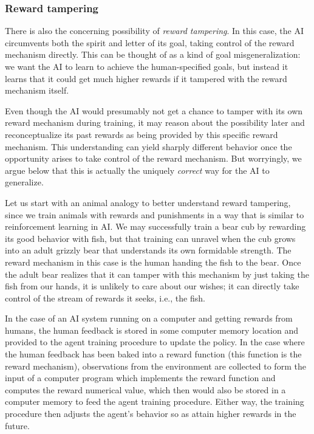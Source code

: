     \subsubsection{Reward tampering}
    \label{sec:existential:misagencyreward:tampering}

There is also the concerning possibility of \textit{reward tampering}. In this case, the AI circumvents both the spirit and letter of its goal, taking control of the reward mechanism directly. This can be thought of as a kind of goal misgeneralization: we want the AI to learn to achieve the human-specified goals, but instead it learns that it could get much higher rewards if it tampered with the reward mechanism itself.

Even though the AI would presumably not get a chance to tamper with its own reward mechanism during training, it may reason about the possibility later and reconceptualize its past rewards as being provided by this specific reward mechanism. 
This understanding can yield sharply different behavior once the opportunity arises to take control of the reward mechanism. But worryingly, we argue below that this is actually the uniquely \emph{correct} way for the AI to generalize.

Let us start with an animal analogy to better understand reward tampering, since we train animals with rewards and punishments in a way that is similar to reinforcement learning in AI. We may successfully train a bear cub by rewarding its good behavior with fish, but that training can unravel when the cub grows into an adult grizzly bear that understands its own formidable strength. The reward mechanism in this case is the human handing the fish to the bear. Once the adult bear realizes that it can tamper with this mechanism by just taking the fish from our hands, it is unlikely to care about our wishes; it can directly take control of the stream of rewards it seeks, i.e., the fish.

In the case of an AI system running on a computer and getting rewards from humans, the human feedback is stored in some computer memory location and provided to the agent training procedure to update the policy. In the case where the human feedback has been baked into a reward function (this function is the reward mechanism), observations from the environment are collected to form the input of a computer program which implements the reward function and computes the reward numerical value, which then would also be stored in a computer memory to feed the agent training procedure. Either way, the training procedure then adjusts the agent's behavior so as attain higher rewards in the future. 


